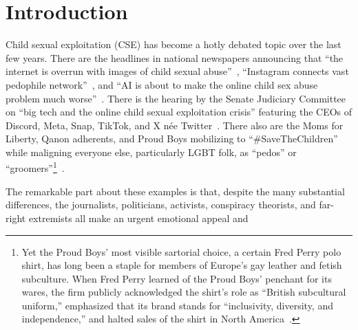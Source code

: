 \documentclass[nonacm,screen]{acmart}
\begin{document}


\maketitle



\section{Introduction}
\label{sec:introduction}

Child sexual exploitation (CSE) has become a hotly debated topic over the last
few years. There are the headlines in national newspapers announcing that ``the
internet is overrun with images of child sexual abuse''~\cite{KellerDance2019},
``Instagram connects vast pedophile network''~\cite{HorwitzBlunt2023}, and ``AI
is about to make the online child sex abuse problem much
worse''~\cite{remus2024}. There is the hearing by the Senate Judiciary Committee
on ``big tech and the online child sexual exploitation crisis'' featuring the
CEOs of Discord, Meta, Snap, TikTok, and X née Twitter~\cite{Durbin2024}. There
also are the Moms for Liberty, Qanon adherents, and Proud Boys mobilizing to
``\#SaveTheChildren'' while maligning everyone else, particularly LGBT folk, as
``pedos'' or ``groomers''\footnote{Yet the Proud Boys' most visible sartorial
choice, a certain Fred Perry polo shirt, has long been a staple for members of
Europe's gay leather and fetish subculture. When Fred Perry learned of the Proud
Boys' penchant for its wares, the firm publicly acknowledged the shirt's role as
``British subcultural uniform,'' emphasized that its brand stands for
``inclusivity, diversity, and independence,'' and halted sales of the shirt in
North
America~\cite{FredPerry2020}.}~\cite{BuntainBarlowea2022,MartinyLawrence2023}.

The remarkable part about these examples is that, despite the many substantial
differences, the journalists, politicians, activists, conspiracy theorists,
and far-right extremists all make an urgent emotional appeal and
\end{document}
